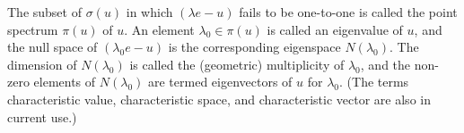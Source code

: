 The subset of $\sigma(u)$ in which $(\lambda e - u)$ fails to be one-to-one is called the point spectrum $\pi(u)$ of $u$. An element $\lambda_0 \in \pi(u)$ is called an eigenvalue of $u$, and the null space of $(\lambda_0 e - u)$ is the corresponding eigenspace $N(\lambda_0)$. The dimension of $N(\lambda_0)$ is called the (geometric) multiplicity of $\lambda_0$, and the non-zero elements of $N(\lambda_0)$ are termed eigenvectors of $u$ for $\lambda_0$. (The terms characteristic value, characteristic space, and characteristic vector are also in current use.)
